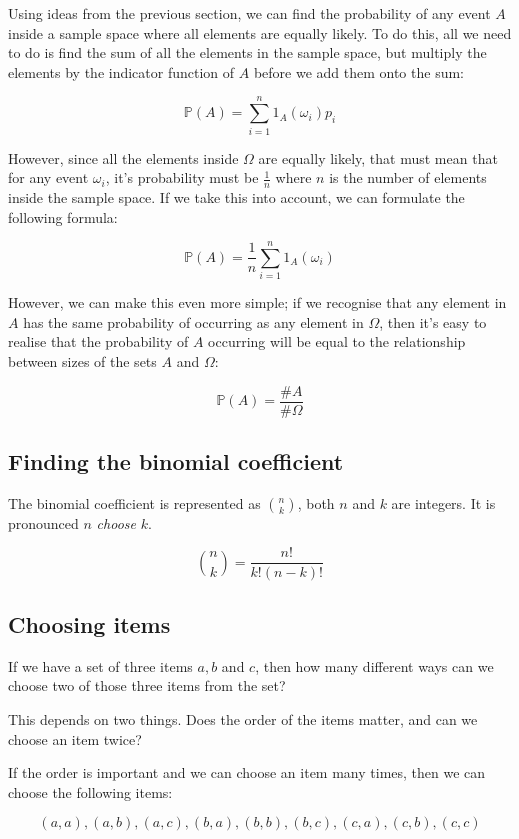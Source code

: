 \documentclass{article}
\begin{document}
Using ideas from the previous section, we can find the probability of any event
$A$ inside a sample space where all elements are equally likely. To do this, all
we need to do is find the sum of all the elements in the sample space, but
multiply the elements by the indicator function of $A$ before we add them onto
the sum:

\[
	\mathbb{P}(A) = \sum\limits_{i=1}^{n} 1_A(\omega_i)p_i
\]

However, since all the elements inside $\Omega$ are equally likely, that must
mean that for any event $\omega_i$, it's probability must be $\frac{1}{n}$ where
$n$ is the number of elements inside the sample space. If we take this into
account, we can formulate the following formula:

\[
	\mathbb{P}(A) = \frac{1}{n}\sum\limits_{i=1}^{n} 1_A(\omega_i)
\]


However, we can make this even more simple; if we recognise that any element in
$A$ has the same probability of occurring as any element in $\Omega$, then it's
easy to realise that the probability of $A$ occurring will be equal to the
relationship between sizes of the sets $A$ and $\Omega$:

\[
	\mathbb{P}(A) = \frac{\#A}{\#\Omega}
\]

\subsection{Finding the binomial coefficient}

The binomial coefficient is represented as $n \choose k$, both $n$ and $k$ are
integers. It is pronounced $n$ {\it choose} $k$.

\[
	{n \choose k} = \frac{n!}{k!(n-k)!}
\]

\subsection{Choosing items}

If we have a set of three items $a, b$ and $c$, then how many different ways can
we choose two of those three items from the set?

This depends on two things. Does the order of the items matter, and can we
choose an item twice?

If the order is important and we can choose an item many times, then we can
choose the following items:

\[
	(a,a), (a,b), (a,c), (b,a), (b,b), (b,c), (c,a), (c,b), (c,c)
\]
\end{document}
